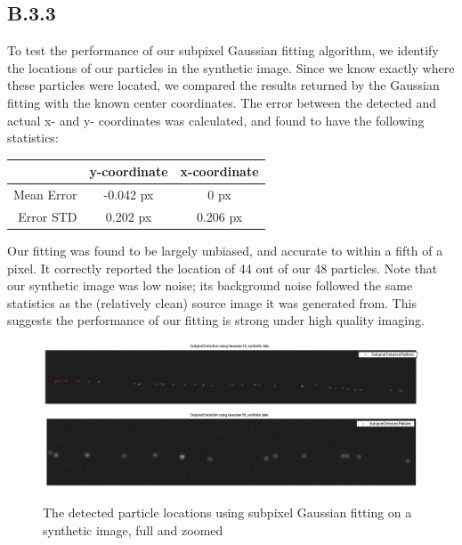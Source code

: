 \documentclass{article}
\begin{document}
\subsection*{B.3.3}

To test the performance of our subpixel Gaussian fitting algorithm, we identify the locations of our particles in the synthetic image. Since we know exactly where these particles were located, we compared the results returned by the Gaussian fitting with the known center coordinates. The error between the detected and actual x- and y- coordinates was calculated, and found to have the following statistics:

\begin{center}
\begin{tabular}{r | c | c}
               & y-coordinate & x-coordinate \\ \hline
    Mean Error & -0.042 px      & 0 px       \\
    Error STD  & 0.202 px       & 0.206 px
\end{tabular}
\end{center}

Our fitting was found to be largely unbiased, and accurate to within a fifth of a pixel. It correctly reported the location of 44 out of our 48 particles. Note that our synthetic image was low noise; its background noise followed the same statistics as the (relatively clean) source image it was generated from. This suggests the performance of our fitting is strong under high quality imaging.

\begin{figure}[H]
\centering
\includegraphics[width=16cm]{figures/subpixel_synthetic_full.png}
\includegraphics[width=16cm]{figures/subpixel_synthetic_zoom.png}
\caption{The detected particle locations using subpixel Gaussian fitting on a
    synthetic image, full and zoomed}
\label{fig:subpixelSynthetic}
\end{figure}
\end{document}

